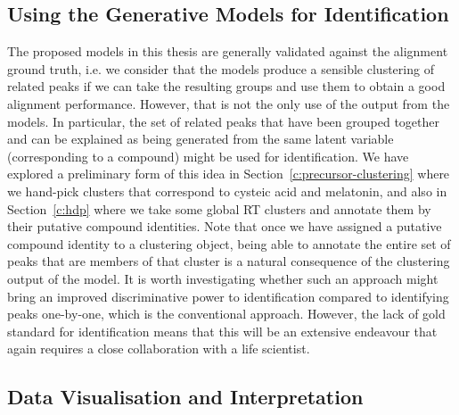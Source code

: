\subsection{Using the Generative Models for Identification}

The proposed models in this thesis are generally validated against the alignment ground truth, i.e. we consider that the models produce a sensible clustering of related peaks if we can take the resulting groups and use them to obtain a good alignment performance. However, that is not the only use of the output from the models. In particular, the set of related peaks that have been grouped together and can be explained as being generated from the same latent variable (corresponding to a compound) might be used for identification. We have explored a preliminary form of this idea in Section~\ref{c:precursor-clustering} where we hand-pick clusters that correspond to cysteic acid and melatonin, and also in Section~\ref{c:hdp} where we take some global RT clusters and annotate them by their putative compound identities. Note that once we have assigned a putative compound identity to a clustering object, being able to annotate the entire set of peaks that are members of that cluster is a natural consequence of the clustering output of the model. It is worth investigating whether such an approach might bring an improved discriminative power to identification compared to identifying peaks one-by-one, which is the conventional approach. However, the lack of gold standard for identification means that this will be an extensive endeavour that again requires a close collaboration with a life scientist.

\subsection{Data Visualisation and Interpretation}

